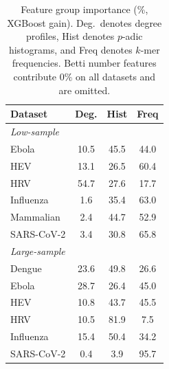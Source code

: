 \begin{table}[t]
\centering
\footnotesize
\caption{Feature group importance (\%, XGBoost gain). Deg.\ denotes degree profiles, Hist denotes $p$-adic histograms, and Freq denotes $k$-mer frequencies. Betti number features contribute $0\%$ on all datasets and are omitted.}
\label{tab:importance}
\begin{tabular}{lccc}
\hline
Dataset & Deg. & Hist & Freq \\
\hline
\multicolumn{4}{l}{\textit{Low-sample}} \\
Ebola & 10.5 & 45.5 & 44.0 \\
HEV & 13.1 & 26.5 & 60.4 \\
HRV & 54.7 & 27.6 & 17.7 \\
Influenza & 1.6 & 35.4 & 63.0 \\
Mammalian & 2.4 & 44.7 & 52.9 \\
SARS-CoV-2 & 3.4 & 30.8 & 65.8 \\
\hline
\multicolumn{4}{l}{\textit{Large-sample}} \\
Dengue & 23.6 & 49.8 & 26.6 \\
Ebola & 28.7 & 26.4 & 45.0 \\
HEV & 10.8 & 43.7 & 45.5 \\
HRV & 10.5 & 81.9 & 7.5 \\
Influenza & 15.4 & 50.4 & 34.2 \\
SARS-CoV-2 & 0.4 & 3.9 & 95.7 \\
\hline
\end{tabular}
\end{table}
